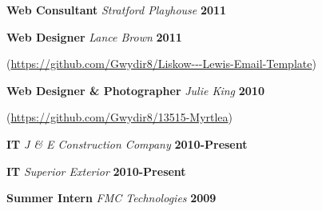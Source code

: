 \documentclass[margin,line]{res}
\begin{document}
{\begin{resume}
          {\bf Web Consultant} {\em Stratford Playhouse} \hfill {\bf  2011}
          

          {\bf Web Designer} {\em Lance Brown} \hfill {\bf 2011}
          \vspace{-.20in}

          (\url{https://github.com/Gwydir8/Liskow---Lewis-Email-Template})

          {\bf Web Designer \& Photographer} {\em Julie King} \hfill {\bf  2010}
          \vspace{-.20in}

          (\url{https://github.com/Gwydir8/13515-Myrtlea})

          \vspace{-.13in}
          {\bf IT} {\em J \& E Construction Company} \hfill {\bf  2010-Present}

          {\bf IT} {\em Superior Exterior} \hfill {\bf  2010-Present}

          {\bf Summer Intern} {\em FMC Technologies} \hfill  {\bf  2009}\\


\end{resume}}
\end{document}
